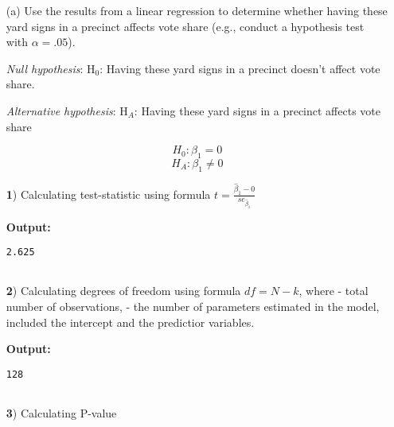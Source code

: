\documentclass[12pt,letterpaper]{article}
\begin{document}
\vspace{.5cm}
\begin{enumerate}
	\item [(a)] Use the results from a linear regression to determine whether having these yard signs in a precinct affects vote share (e.g., conduct a hypothesis test with $\alpha = .05$).
	
	\noindent \textit{Null hypothesis}: $\text{H}_0$: Having these yard signs in a precinct doesn't affect vote share.
	
	\noindent \textit{Alternative hypothesis}: $\text{H}_A$: Having these yard signs in a precinct affects vote share
		
	$$H_0: \beta_1 = 0$$
	$$H_A: \beta_1 \neq 0$$
	
\vspace{0.5cm}

\noindent \textbf 1) Calculating test-statistic using formula $ t = \frac{\hat{\beta}_1 - 0}{se_{\hat{\beta}_1}}$

  
\vspace{.25cm}

\noindent \textbf{Output: }
\begin{verbatim}
2.625
	
\end{verbatim}  
\vspace{.25cm}

\noindent \textbf 2) Calculating degrees of freedom using formula $ df = N-k $, where  - total number of observations,  - the number of parameters estimated in the model, included the intercept and the predictior variables.   
\vspace{0.5cm}


  
\vspace{.25cm}

\noindent \textbf{Output: }
\begin{verbatim}
128
	
\end{verbatim}  
\vspace{.25cm}

\noindent \textbf 3) Calculating P-value
\vspace{0.5cm}


  
\vspace{.25cm}


\end{enumerate}
\end{document}
